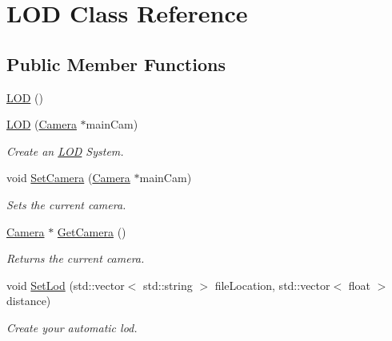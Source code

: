 \hypertarget{class_l_o_d}{}\section{L\+OD Class Reference}
\label{class_l_o_d}
\subsection*{Public Member Functions}
\begin{DoxyCompactItemize}
\item 
\mbox{\hyperlink{class_l_o_d_abc34970b0abc2735ffed661eded0717f}{L\+OD}} ()
\item 
\mbox{\label{class_l_o_d_ab51115c23b903fdc498789831bee33d7}} 
\mbox{\hyperlink{class_l_o_d_ab51115c23b903fdc498789831bee33d7}{L\+OD}} (\mbox{\hyperlink{class_camera}{Camera}} $\ast$main\+Cam)
\begin{DoxyCompactList}\small\item\em Create an \mbox{\hyperlink{class_l_o_d}{L\+OD}} System. \end{DoxyCompactList}\item 
\mbox{\label{class_l_o_d_ac3b88c688acd9ab6ebe33a56b5b9fed5}} 
void \mbox{\hyperlink{class_l_o_d_ac3b88c688acd9ab6ebe33a56b5b9fed5}{Set\+Camera}} (\mbox{\hyperlink{class_camera}{Camera}} $\ast$main\+Cam)
\begin{DoxyCompactList}\small\item\em Sets the current camera. \end{DoxyCompactList}\item 
\mbox{\label{class_l_o_d_a2c3689fd7466efbd716403e3e6cc6c0b}} 
\mbox{\hyperlink{class_camera}{Camera}} $\ast$ \mbox{\hyperlink{class_l_o_d_a2c3689fd7466efbd716403e3e6cc6c0b}{Get\+Camera}} ()
\begin{DoxyCompactList}\small\item\em Returns the current camera. \end{DoxyCompactList}\item 
\mbox{\label{class_l_o_d_a0d107608bbb612c62911862d89fc954f}} 
void \mbox{\hyperlink{class_l_o_d_a0d107608bbb612c62911862d89fc954f}{Set\+Lod}} (std\+::vector$<$ std\+::string $>$ file\+Location, std\+::vector$<$ float $>$ distance)
\begin{DoxyCompactList}\small\item\em Create your automatic lod. \end{DoxyCompactList}\item 

\end{DoxyCompactItemize}
